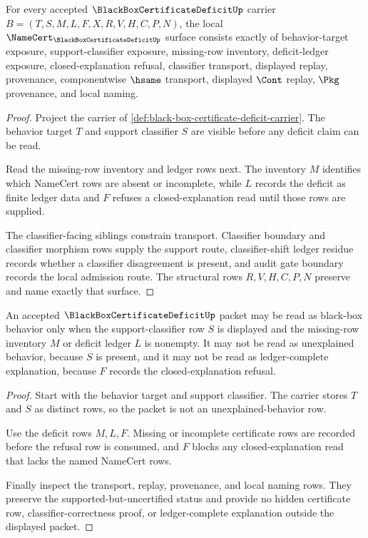 \begin{theorem}
\label{thm:black-box-certificate-deficit-namecert-obligations}
For every accepted $\BlackBoxCertificateDeficitUp$ carrier $B=(T,S,M,L,F,X,R,V,H,C,P,N)$, the local $\NameCert_{\BlackBoxCertificateDeficitUp}$ surface consists exactly of behavior-target exposure, support-classifier exposure, missing-row inventory, deficit-ledger exposure, closed-explanation refusal, classifier transport, displayed replay, provenance, componentwise $\hsame$ transport, displayed $\Cont$ replay, $\Pkg$ provenance, and local naming.
\end{theorem}
\begin{proof}
Project the carrier of \autoref{def:black-box-certificate-deficit-carrier}. The behavior target $T$ and support classifier $S$ are visible before any deficit claim can be read.

Read the missing-row inventory and ledger rows next. The inventory $M$ identifies which NameCert rows are absent or incomplete, while $L$ records the deficit as finite ledger data and $F$ refuses a closed-explanation read until those rows are supplied.

The classifier-facing siblings constrain transport. Classifier boundary and classifier morphism rows supply the support route, classifier-shift ledger residue records whether a classifier disagreement is present, and audit gate boundary records the local admission route. The structural rows $R,V,H,C,P,N$ preserve and name exactly that surface.
\end{proof}

\begin{theorem}
\label{thm:black-box-certificate-deficit-closed-explanation-refusal}
An accepted $\BlackBoxCertificateDeficitUp$ packet may be read as black-box behavior only when the support-classifier row $S$ is displayed and the missing-row inventory $M$ or deficit ledger $L$ is nonempty. It may not be read as unexplained behavior, because $S$ is present, and it may not be read as ledger-complete explanation, because $F$ records the closed-explanation refusal.
\end{theorem}
\begin{proof}
Start with the behavior target and support classifier. The carrier stores $T$ and $S$ as distinct rows, so the packet is not an unexplained-behavior row.

Use the deficit rows $M,L,F$. Missing or incomplete certificate rows are recorded before the refusal row is consumed, and $F$ blocks any closed-explanation read that lacks the named NameCert rows.

Finally inspect the transport, replay, provenance, and local naming rows. They preserve the supported-but-uncertified status and provide no hidden certificate row, classifier-correctness proof, or ledger-complete explanation outside the displayed packet.
\end{proof}

